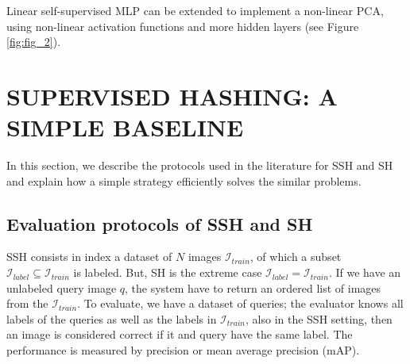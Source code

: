 \documentclass{article}
\begin{document}
Linear self-supervised MLP can be extended to implement a non-linear PCA, using non-linear activation functions and more hidden layers (see Figure \ref{fig:fig_2}).

\section{SUPERVISED HASHING: A SIMPLE BASELINE}


In this section, we describe the protocols used in the literature for SSH and SH and explain how a simple strategy efficiently solves the similar problems.

\subsection{Evaluation protocols of SSH and SH}

SSH consists in index a dataset of $N$ images $\mathcal{I}_{train}$, of which a subset $\mathcal{I}_{label} \subseteq \mathcal{I}_{train}$ is labeled.  But, SH is the extreme case $\mathcal{I}_{label} = \mathcal{I}_{train}$. If we have an unlabeled query image $q$, the system have to return an ordered list of images from the $\mathcal{I}_{train}$. To evaluate, we have a dataset of queries; the evaluator knows all labels of the queries as well as the labels in $\mathcal{I}_{train}$, also in the SSH setting, then an image is considered correct if it and query have the same label. The performance is measured by precision or mean average precision (mAP).
\end{document}
